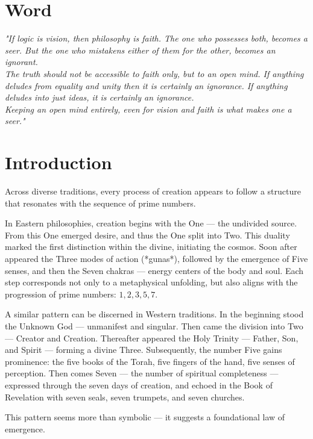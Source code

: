 \section*{Word}
\begin{center}
\emph{"If logic is vision, then philosophy is faith. The one who possesses both, becomes a seer. But the one who mistakens either of them for the other, becomes an ignorant. \\
The truth should not be accessible to faith only, but to an open mind. If anything deludes from equality and unity then it is certainly an ignorance. If anything deludes into just ideas, it is certainly an ignorance. \\
Keeping an open mind entirely, even for vision and faith is what makes one a seer."}
\end{center}

\section{Introduction}

Across diverse traditions, every process of creation appears to follow a structure that resonates with the sequence of prime numbers.

In Eastern philosophies, creation begins with the One — the undivided source. From this One emerged desire, and thus the One split into Two. This duality marked the first distinction within the divine, initiating the cosmos. Soon after appeared the Three modes of action (*gunas*), followed by the emergence of Five senses, and then the Seven chakras — energy centers of the body and soul. Each step corresponds not only to a metaphysical unfolding, but also aligns with the progression of prime numbers: $1, 2, 3, 5, 7$.

A similar pattern can be discerned in Western traditions. In the beginning stood the Unknown God — unmanifest and singular. Then came the division into Two — Creator and Creation. Thereafter appeared the Holy Trinity — Father, Son, and Spirit — forming a divine Three. Subsequently, the number Five gains prominence: the five books of the Torah, five fingers of the hand, five senses of perception. Then comes Seven — the number of spiritual completeness — expressed through the seven days of creation, and echoed in the Book of Revelation with seven seals, seven trumpets, and seven churches.

This pattern seems more than symbolic — it suggests a foundational law of emergence.

